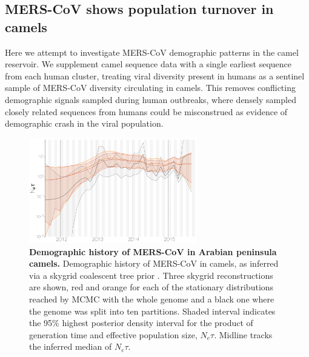 \documentclass[11pt,oneside,letterpaper]{article}
\begin{document}
\subsection*{MERS-CoV shows population turnover in camels}

Here we attempt to investigate MERS-CoV demographic patterns in the camel reservoir.
We supplement camel sequence data with a single earliest sequence from each human cluster, treating viral diversity present in humans as a sentinel sample of MERS-CoV diversity circulating in camels.
This removes conflicting demographic signals sampled during human outbreaks, where densely sampled closely related sequences from humans could be misconstrued as evidence of demographic crash in the viral population.

\begin{figure}[h]
\centering
	\includegraphics[width=0.65\textwidth]{figures/mers_skygrid.png}
	\caption{\textbf{Demographic history of MERS-CoV in Arabian peninsula camels.}
Demographic history of MERS-CoV in camels, as inferred via a skygrid coalescent tree prior \citep{gill_2013}.
Three skygrid reconstructions are shown, red and orange for each of the stationary distributions reached by MCMC with the whole genome and a black one where the genome was split into ten partitions.
Shaded interval indicates the 95\% highest posterior density interval for the product of generation time and effective population size, $N_{e}\tau$.
Midline tracks the inferred median of $N_{e}\tau$.
	}
	\label{skygrid}
\end{figure}
\end{document}
